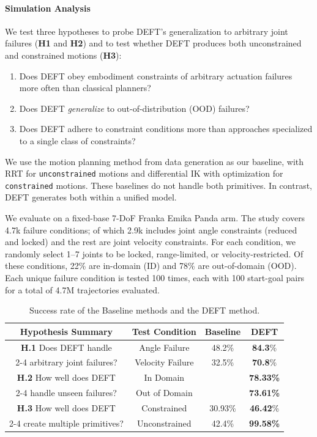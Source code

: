 \paragraph{Simulation Analysis}
We test three hypotheses to probe DEFT's generalization to arbitrary joint failures (\textbf{H1} and \textbf{H2}) and to test whether DEFT produces both unconstrained and constrained motions (\textbf{H3}):
\begin{enumerate}
\item[\textbf{H.1}] Does DEFT obey embodiment constraints of arbitrary actuation failures more often than classical planners?
\item[\textbf{H.2}] Does DEFT \emph{generalize} to out-of-distribution (OOD) failures?
\item[\textbf{H.3}] Does DEFT adhere to constraint conditions more than approaches specialized to a single class of constraints?
\end{enumerate}

We use the motion planning method from data generation as our baseline, with RRT for \texttt{unconstrained} motions and differential IK with optimization for \texttt{constrained} motions. These baselines do not handle both primitives. In contrast, \textsc{DEFT} generates both within a unified model.

We evaluate on a fixed-base 7-DoF Franka Emika Panda arm. The study covers 4.7k failure conditions; of which 2.9k includes joint angle constraints (reduced and locked) and the rest are joint velocity constraints. For each condition, we randomly select 1--7 joints to be locked, range-limited, or velocity-restricted. Of these conditions, 22\% are in-domain (ID) and 78\% are out-of-domain (OOD). Each unique failure condition is tested 100 times, each with 100 start-goal pairs for a total of 4.7M trajectories evaluated.

\begin{table}[h]
\centering
\begin{tabular}{|c|c|c|c|}
\hline
\textbf{Hypothesis Summary} & \textbf{Test Condition}  & \textbf{Baseline} & \textbf{DEFT} \\ \hline
\textbf{H.1} Does DEFT handle & Angle Failure & 48.2\% & \textbf{84.3}\% \\ \cline{2-4}
arbitrary joint failures?& Velocity Failure & 32.5\% & \textbf{70.8}\% \\ \hline
\textbf{H.2} How well does DEFT & In Domain & \cellcolor{black} & \textbf{78.33\%} \\ \cline{2-4}
 handle unseen failures?& Out of Domain & \cellcolor{black} & \textbf{73.61\%} \\ \hline
\textbf{H.3} How well does DEFT  & Constrained & 30.93\% & \textbf{46.42}\% \\ \cline{2-4}
create multiple primitives?  & Unconstrained & 42.4\% & \textbf{99.58\%} \\ \hline
\end{tabular}
\caption{Success rate of the Baseline methods and the DEFT method.}
\label{tab:deft:performance}
\end{table}

